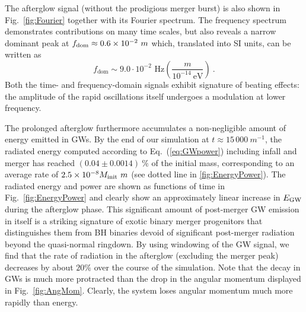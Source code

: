 \documentclass[11pt]{report}  %
\begin{document}
The afterglow signal (without the prodigious merger burst)
is also shown in Fig.~\ref{fig:Fourier} together with 
its Fourier spectrum. The frequency spectrum demonstrates
contributions on many time scales, but also reveals a
narrow dominant peak at $f_{\rm dom}\approx
0.6\times 10^{-2}~m$ which, translated into SI units, can
be written as
%
\begin{equation}
    f_{\textrm{dom}} \sim 9.0 \cdot 10^{-2}\text{ Hz} \left( \frac{m}{10^{-14}~\text{eV}}
    \right)~. \label{eqn:freqGW}
\end{equation}
%
Both the time- and frequency-domain signals exhibit signature
of beating effects: the amplitude of the rapid oscillations
itself undergoes a modulation at lower frequency.


The prolonged afterglow furthermore accumulates a non-negligible
amount of energy emitted in GWs. By the end of our simulation
at $t\approx 15\,000~m^{-1}$, the radiated energy computed
according to Eq.~(\ref{eq:GWpower}) including
infall and merger has reached
$(0.04 \pm 0.0014)~\% $ of the initial mass,
corresponding to an average rate of $2.5 \times 10^{-8} M_{\rm init}~m$ (see dotted line in \cref{fig:EnergyPower}). 
The radiated energy and power are shown
as functions of time in Fig.~\ref{fig:EnergyPower}
and clearly show an approximately linear increase in
$E_{\rm GW}$ during the afterglow phase. 
This significant amount of post-merger GW emission in itself is a
striking signature of exotic binary merger progenitors
that distinguishes them from BH binaries devoid 
of significant post-merger radiation beyond the quasi-normal ringdown. 
By using windowing of the GW signal, we find that the rate of radiation in the afterglow (excluding the merger peak) decreases by about $20 \%$ over the course of the simulation.
Note that the decay in GWs is much more protracted than the drop in the angular momentum displayed in Fig.~\ref{fig:AngMom}.
Clearly, the system loses angular momentum much more rapidly
than energy.
\end{document}

